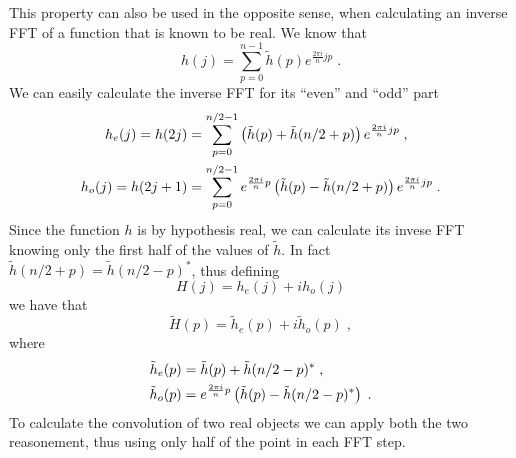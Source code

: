 \documentclass[12pt]{article}
\begin{document}
This property can also be used in the opposite sense, when calculating an inverse FFT of a function that is known to be real.
We know that
\begin{equation}
h(j)=\sum_{p=0}^{n-1} \tilde h (p) e^{\frac{2 \pi i}{n} j p}\;.
\end{equation}
We can easily calculate the inverse FFT for its ``even'' and ``odd'' part
\begin{align}
h_e(j)=h(2j)&=\sum_{p=0}^{n/2-1} \left( \tilde h (p) +  \tilde h (n/2 + p) \right)  e^{\frac{2 \pi i}{n} j p}\;,\notag\\
h_o(j)=h(2j+1)&=\sum_{p=0}^{n/2-1} e^{\frac{2 \pi i}{n} p} \left( \tilde h (p) -  \tilde h (n/2 + p) \right)  e^{\frac{2 \pi i}{n} j p}\;.
\end{align}
Since the function $h$ is by hypothesis real, we can calculate its invese FFT knowing only the first half of the values of $\tilde h$.
In fact $\tilde h (n/2+p)=\tilde h(n/2-p)^*$, thus defining
\begin{equation}
H(j)=h_e(j)+i h_o(j)
\end{equation}
we have that
\begin{equation}
\tilde H(p) = \tilde h_e (p) + i \tilde h_o(p) \;,
\end{equation}
where
\begin{align}
\tilde h_e(p)&= \tilde h (p) +  \tilde h (n/2 - p)^*\;,\notag\\
\tilde h_o(p)&= e^{\frac{2 \pi i}{n} p} \left( \tilde h (p) -  \tilde h (n/2 - p)^* \right)\;.
\end{align}
To calculate the convolution of two real objects  we can apply both the two reasonement, thus using only half of the point in each FFT step.
\end{document}

